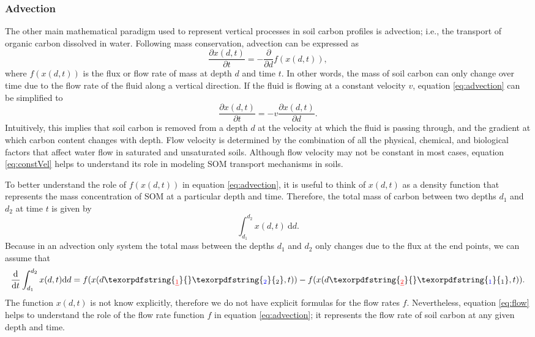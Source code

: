 \documentclass[11pt, oneside, a4paper]{article}   	%
\providecommand{\DIFaddtex}[1]{{\protect\color{blue}\uwave{#1}}} %
\providecommand{\DIFdeltex}[1]{{\protect\color{red}\sout{#1}}}                      %
\providecommand{\DIFaddbegin}{} %
\providecommand{\DIFaddend}{} %
\providecommand{\DIFdelbegin}{} %
\providecommand{\DIFdelend}{} %
\providecommand{\DIFadd}[1]{\texorpdfstring{\DIFaddtex{#1}}{#1}} %
\providecommand{\DIFdel}[1]{\texorpdfstring{\DIFdeltex{#1}}{}} %
\newcommand{\DIFscaledelfig}{0.5}
\newlength{\DIFdelgraphicswidth} %
\newlength{\DIFdelgraphicsheight} %
\newcommand{\DIFaddincludegraphics}[2][]{{\color{blue}\fbox{\DIFOincludegraphics[#1]{#2}}}} %
\newcommand{\DIFdelincludegraphics}[2][]{%
\sbox{\DIFdelgraphicsbox}{\DIFOincludegraphics[#1]{#2}}%
\settoboxwidth{\DIFdelgraphicswidth}{\DIFdelgraphicsbox} %
\settoboxtotalheight{\DIFdelgraphicsheight}{\DIFdelgraphicsbox} %
\scalebox{\DIFscaledelfig}{%
\parbox[b]{\DIFdelgraphicswidth}{\usebox{\DIFdelgraphicsbox}\\[-\baselineskip] \rule{\DIFdelgraphicswidth}{0em}}\llap{\resizebox{\DIFdelgraphicswidth}{\DIFdelgraphicsheight}{%
\setlength{\unitlength}{\DIFdelgraphicswidth}%
\begin{picture}(1,1)%
\thicklines\linethickness{2pt} %
{\color[rgb]{1,0,0}\put(0,0){\framebox(1,1){}}}%
{\color[rgb]{1,0,0}\put(0,0){\line( 1,1){1}}}%
{\color[rgb]{1,0,0}\put(0,1){\line(1,-1){1}}}%
\end{picture}%
}\hspace*{3pt}}} %
} %
\DeclareRobustCommand{\DIFaddbegin}{\DIFOaddbegin \let\includegraphics\DIFaddincludegraphics} %
\DeclareRobustCommand{\DIFaddend}{\DIFOaddend \let\includegraphics\DIFOincludegraphics} %
\DeclareRobustCommand{\DIFdelbegin}{\DIFOdelbegin \let\includegraphics\DIFdelincludegraphics} %
\DeclareRobustCommand{\DIFdelend}{\DIFOaddend \let\includegraphics\DIFOincludegraphics} %
\begin{document}
\subsubsection{Advection}
The other main mathematical paradigm used to represent vertical processes in soil carbon profiles is advection; i.e., the transport of organic carbon dissolved in water. 
Following mass conservation, advection can be expressed as
\begin{equation} \label{eq:advection}
\frac{\partial x(d, t)}{\partial t} = - \frac{\partial }{\partial d} f(x(d, t)),
\end{equation}
where $f(x(d, t))$ is the flux or flow rate of mass at depth $d$ and time $t$. In other words, the mass of soil carbon can only change over time due to the flow rate of the fluid along a vertical direction. If the fluid is flowing at a constant velocity $v$, equation \ref{eq:advection} can be simplified to
\begin{equation} \label{eq:constVel}
\frac{\partial x(d, t)}{\partial t} = -v \frac{\partial x(d, t)}{\partial d}.
\end{equation}
Intuitively, this implies that soil carbon is removed from a depth $d$ at the velocity at which the fluid is passing through, and the gradient at which carbon content changes with depth. Flow velocity is determined by the combination of all the physical, chemical, and biological factors that affect water flow in saturated and unsaturated soils. Although flow velocity may not be constant in most cases, equation \ref{eq:constVel} helps to understand its role in modeling SOM transport mechanisms in soils.  

To better understand the role of $f(x(d, t))$ in equation \ref{eq:advection}, it is useful to think of $x(d, t)$ as a density function \citep{LeVeque1990} that represents the mass concentration of SOM at a particular depth and time. Therefore, the total mass of carbon between two depths $d_1$ and $d_2$ at time $t$ is given by
$$
\int_{d_1}^{d_2} x(d, t) \ \mathrm{d}d.
$$
Because in an advection only system the total mass between the depths $d_1$ and $d_2$ only changes due to the flux at the end points, we can assume that
\begin{equation} \label{eq:flow}
\frac{\mathrm{d}}{\mathrm{d}t} \int_{d_1}^{d_2} x(d, t) \mathrm{d}d = f(x(d\DIFdelbegin \DIFdel{_1}\DIFdelend \DIFaddbegin \DIFadd{_2}\DIFaddend , t)) -f(x(d\DIFdelbegin \DIFdel{_2}\DIFdelend \DIFaddbegin \DIFadd{_1}\DIFaddend , t)).
\end{equation}
The function $x(d, t)$ is not know explicitly, therefore we do not have explicit formulas for the flow rates $f$. Nevertheless, equation \ref{eq:flow} helps to understand the role of the flow rate function $f$ in equation \ref{eq:advection}; it represents the flow rate of soil carbon at any given depth and time. 
\end{document}
